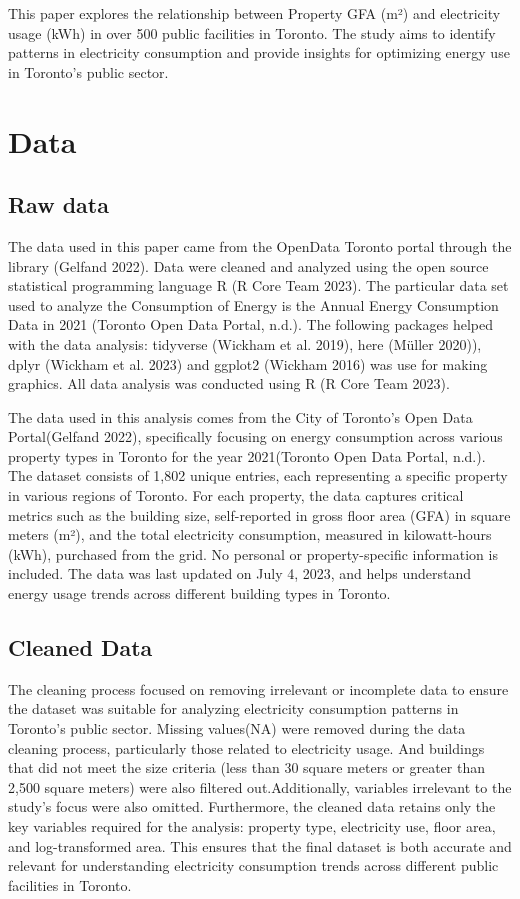 \documentclass[
  letterpaper,
  DIV=11,
  numbers=noendperiod]{scrartcl}
\begin{document}
This paper explores the relationship between Property GFA (m²) and
electricity usage (kWh) in over 500 public facilities in Toronto. The
study aims to identify patterns in electricity consumption and provide
insights for optimizing energy use in Toronto's public sector.

\section{Data}\label{sec-data}

\subsection{Raw data}\label{raw-data}

The data used in this paper came from the OpenData Toronto portal
through the library (Gelfand 2022). Data were cleaned and analyzed using
the open source statistical programming language R (R Core Team 2023).
The particular data set used to analyze the Consumption of Energy is the
Annual Energy Consumption Data in 2021 (Toronto Open Data Portal, n.d.).
The following packages helped with the data analysis: tidyverse (Wickham
et al. 2019), here (Müller 2020)), dplyr (Wickham et al. 2023) and
ggplot2 (Wickham 2016) was use for making graphics. All data analysis
was conducted using R (R Core Team 2023).

The data used in this analysis comes from the City of Toronto's Open
Data Portal(Gelfand 2022), specifically focusing on energy consumption
across various property types in Toronto for the year 2021(Toronto Open
Data Portal, n.d.). The dataset consists of 1,802 unique entries, each
representing a specific property in various regions of Toronto. For each
property, the data captures critical metrics such as the building size,
self-reported in gross floor area (GFA) in square meters (m²), and the
total electricity consumption, measured in kilowatt-hours (kWh),
purchased from the grid. No personal or property-specific information is
included. The data was last updated on July 4, 2023, and helps
understand energy usage trends across different building types in
Toronto.

\subsection{Cleaned Data}\label{cleaned-data}

The cleaning process focused on removing irrelevant or incomplete data
to ensure the dataset was suitable for analyzing electricity consumption
patterns in Toronto's public sector. Missing values(NA) were removed
during the data cleaning process, particularly those related to
electricity usage. And buildings that did not meet the size criteria
(less than 30 square meters or greater than 2,500 square meters) were
also filtered out.Additionally, variables irrelevant to the study's
focus were also omitted. Furthermore, the cleaned data retains only the
key variables required for the analysis: property type, electricity use,
floor area, and log-transformed area. This ensures that the final
dataset is both accurate and relevant for understanding electricity
consumption trends across different public facilities in Toronto.
\end{document}
